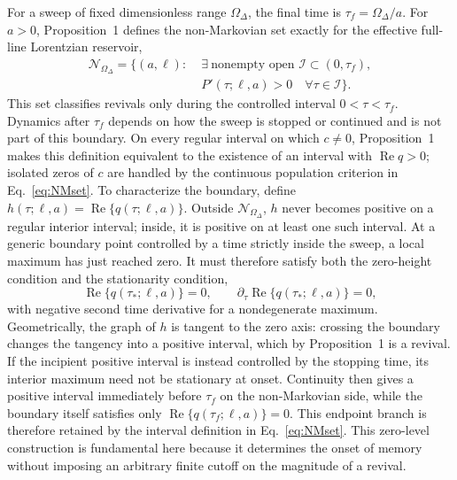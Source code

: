 \documentclass[reprint,superscriptaddress,floatfix,amsmath,amssymb,prresearch,aps]{revtex4-2}
\newcommand{\Ree}{\operatorname{Re}}
\begin{document}
For a sweep of fixed dimensionless range \(\Omega_\Delta\), the final time is
\(\tau_f=\Omega_\Delta/a\). For \(a>0\), Proposition~1 defines the
non-Markovian set exactly for the effective full-line Lorentzian reservoir,
\begin{equation}
\begin{aligned}
\mathcal N_{\Omega_\Delta}=\{(a,\ell):\;&
\exists\ \text{nonempty open }\mathcal I\subset(0,\tau_f),\\[-2pt]
&P'(\tau;\ell,a)>0\quad\forall\tau\in\mathcal I\}.
\end{aligned}
\label{eq:NMset}
\end{equation}
This set classifies revivals only during the controlled interval
\(0<\tau<\tau_f\). Dynamics after \(\tau_f\) depends on how the sweep is
stopped or continued and is not part of this boundary. On every regular
interval on which \(c\neq0\), Proposition~1 makes this definition equivalent
to the existence of an interval with \(\Ree q>0\); isolated zeros of \(c\) are
handled by the continuous population criterion in Eq.~\eqref{eq:NMset}.
To characterize the boundary, define
\(h(\tau;\ell,a)=\Ree\{q(\tau;\ell,a)\}\). Outside
\(\mathcal N_{\Omega_\Delta}\), \(h\) never becomes positive on a regular
interior interval; inside, it is positive on at least one such interval. At a
generic boundary point controlled by a time strictly inside the sweep, a local
maximum has just reached zero. It must
therefore satisfy both the zero-height condition and the stationarity condition,
\begin{equation}
\Ree\{q(\tau_*;\ell,a)\}=0,
\qquad
\partial_\tau\Ree\{q(\tau_*;\ell,a)\}=0,
\label{eq:doubletangency}
\end{equation}
with negative second time derivative for a nondegenerate maximum. Geometrically,
the graph of \(h\) is tangent to the zero axis: crossing the boundary changes
the tangency into a positive interval, which by Proposition~1 is a revival.
If the incipient positive interval is instead controlled by the stopping
time, its interior maximum need not be stationary at onset. Continuity then
gives a positive interval immediately before \(\tau_f\) on the
non-Markovian side, while the boundary itself satisfies only
\(\Ree\{q(\tau_f;\ell,a)\}=0\). This endpoint branch is therefore retained by
the interval definition in Eq.~\eqref{eq:NMset}. This
zero-level construction is fundamental here because it determines the onset
of memory without imposing an arbitrary finite cutoff on the magnitude of a
revival.
\end{document}
